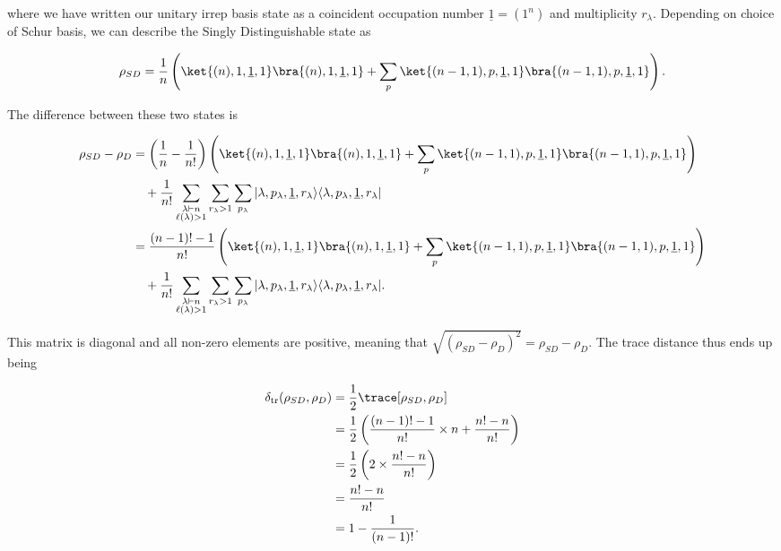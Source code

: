 \noindent where we have written our unitary irrep basis state as a coincident occupation number $\underline{1}=(1^n)$ and multiplicity $r_\lambda$. Depending on choice of Schur basis, we can describe the Singly Distinguishable state as

\begin{equation}
\rho_{SD} = \frac{1}{n}\left(\ket{(n),1,\underline{1},1}\bra{(n),1,\underline{1},1} + \sum_{p}\ket{(n-1,1),p,\underline{1},1}\bra{(n-1,1),p,\underline{1},1}\right).
\end{equation}

\noindent The difference between these two states is

\begin{align}
\rho_{SD}-\rho_D &= \left(\frac{1}{n}-\frac{1}{n!}\right)\left(\ket{(n),1,\underline{1},1}\bra{(n),1,\underline{1},1} + \sum_{p}\ket{(n-1,1),p,\underline{1},1}\bra{(n-1,1),p,\underline{1},1}\right)\nonumber\\
&\quad+ \frac{1}{n!}\sum_{\substack{\lambda \vdash n\\\ell(\lambda) > 1}} \sum_{r_\lambda>1} \sum_{p_\lambda} |\lambda,p_\lambda,\underline{1},r_\lambda\rangle\langle \lambda,p_\lambda,\underline{1},r_\lambda|\\
&= \frac{(n-1)!-1}{n!}\left(\ket{(n),1,\underline{1},1}\bra{(n),1,\underline{1},1} + \sum_{p}\ket{(n-1,1),p,\underline{1},1}\bra{(n-1,1),p,\underline{1},1}\right)\nonumber\\
&\quad+ \frac{1}{n!}\sum_{\substack{\lambda \vdash n\\\ell(\lambda) > 1}} \sum_{r_\lambda>1} \sum_{p_\lambda} |\lambda,p_\lambda,\underline{1},r_\lambda\rangle\langle \lambda,p_\lambda,\underline{1},r_\lambda|.
\end{align}

\noindent This matrix is diagonal and all non-zero elements are positive, meaning that $\sqrt{(\rho_{SD}-\rho_D)^2}=\rho_{SD}-\rho_D$. The trace distance thus ends up being

\begin{align}
\delta_{\mathrm{tr}}(\rho_{SD},\rho_{D}) &= \frac{1}{2}\trace[\rho_{SD},\rho_{D}]\\
&= \frac{1}{2}\left(\frac{(n-1)!-1}{n!}\times n + \frac{n!-n}{n!}\right)\\
&= \frac{1}{2}\left(2\times\frac{n!-n}{n!}\right)\\
&= \frac{n!-n}{n!}\\
&= 1 - \frac{1}{(n-1)!}.
\end{align}

